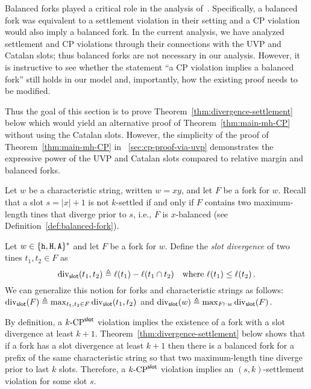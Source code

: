 Balanced forks played a critical role 
in the analysis of~\cite{LinearConsistency}. 
Specifically, a balanced fork was equivalent to a settlement violation in their setting 
and a CP violation would also imply a balanced fork.
In the current analysis, 
we have analyzed settlement and CP violations through 
their connections with the UVP and Catalan slots; 
thus balanced forks are not necessary in our analysis. 
However, it is instructive to see 
whether the statement ``a CP violation implies a balanced fork'' 
still holds in our model 
and, importantly, 
how the existing proof needs to be modified. 

Thus the goal of this section is to prove 
Theorem~\ref{thm:divergence-settlement} below which 
would yield an alternative proof of Theorem~\ref{thm:main-mh-CP} 
without using the Catalan slots.
However, the simplicity of the proof of Theorem~\ref{thm:main-mh-CP} 
in \Section~\ref{sec:cp-proof-via-uvp} 
demonstrates the expressive power of the UVP and Catalan slots 
compared to relative margin and balanced forks.



Let $w$ be a characteristic string, written $w = xy$, 
and let $F$ be a fork for $w$. 
Recall that a slot $s = |x| + 1$ is not $k$-settled 
if and only if $F$ contains 
two maximum-length tines that diverge prior to $s$, 
i.e., $F$ is $x$-balanced (see Definition~\ref{def:balanced-fork}).


\begin{definition}\label{def:slot-divergence}
  Let $w \in \{\mathtt{h}, \mathtt{H}, \mathtt{A}\}^*$ and let $F$ be a fork for $w$. 
  Define the \emph{slot divergence} of 
  two tines $t_1, t_2 \in F$ 
  as 
  \begin{equation}\label{eq:slot-divergence-tines}
    \mathrm{div}_{\mathsf{slot}}(t_1, t_2) \triangleq \ell(t_1) - \ell(t_1 \cap t_2)
    \quad\text{where $\ell(t_1) \leq \ell(t_2)$}
    \,.
  \end{equation}
  We can generalize this notion for forks and characteristic strings as follows: 
  $\mathrm{div}_{\mathsf{slot}}(F) \triangleq \max_{t_1, t_2 \in F} \mathrm{div}_{\mathsf{slot}}(t_1, t_2)$ and 
  $\mathrm{div}_{\mathsf{slot}}(w) \triangleq \max_{F \vdash w} \mathrm{div}_{\mathsf{slot}}(F)$. 
\end{definition}

By definition, a ${k}\text{-}\mathrm{CP}^{\mathsf{slot}}$ violation 
implies the existence of a fork with a slot divergence at least $k + 1$. 
Theorem~\ref{thm:divergence-settlement} below 
shows that if a fork has a slot divergence at least $k+1$ then 
there is a balanced fork for a prefix of the same characteristic string so that 
two maximum-length tine diverge prior to last $k$ slots. 
Therefore, a ${k}\text{-}\mathrm{CP}^{\mathsf{slot}}$ violation implies an $(s,k)$-settlement violation 
for some slot $s$.



